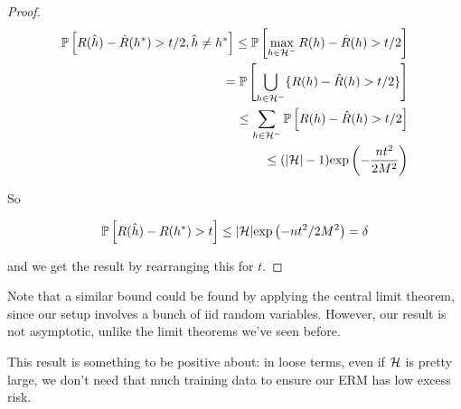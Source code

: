 \documentclass[11pt]{scrartcl}
\begin{document}
\begin{theorem}
\begin{proof}
\begin{align}
    \mathbb{P} \left[ R(\hat{h}) - \hat{R}(h^*) > t/2, \hat{h} \neq h^* \right] \le \mathbb{P} \left[ \max_{h \in \mathcal{H}^-} R(h) - \hat{R}(h) > t/2 \right] \\
    = \mathbb{P} \left[ \bigcup_{h \in \mathcal{H}^-} \{ R(h) - \hat{R}(h) > t/2 \} \right] \\
    \le \sum_{h \in \mathcal{H}^-} \mathbb{P} \left[ R(h) - \hat{R}(h) > t/2 \right] \\
    \le (|\mathcal{H}|-1) \text{exp} \left( -\frac{nt^2}{2M^2} \right)
\end{align}


So

\begin{equation}
    \mathbb{P} \left[ R(\hat{h}) - R(h^*) > t \right] \le |\mathcal{H}| \text{exp} \left( -nt^2 / 2M^2 \right) = \delta
\end{equation}

and we get the result by rearranging this for $t$.
\end{proof}
\label{Finite hypothesis class bound}
\end{theorem}

Note that a similar bound could be found by applying the central limit theorem, since our setup involves a bunch of iid random variables. However, our result is not asymptotic, unlike the limit theorems we've seen before.

This result is something to be positive about: in loose terms, even if $\mathcal{H}$ is pretty large, we don't need that much training data to ensure our ERM has low excess risk.
\end{document}

